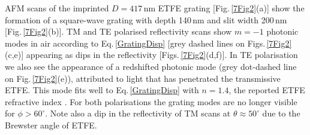 AFM scans of the imprinted $D=417$\,nm ETFE grating [Fig.\,\ref{7Fig2}(a)] show the formation of a square-wave grating with depth 140\,nm and slit width 200\,nm [Fig.\,\ref{7Fig2}(b)]. TM and TE polarised reflectivity scans show $m=-1$ photonic modes in air according to Eq.\,\ref{GratingDisp} [grey dashed lines on Figs.\,\ref{7Fig2}(c,e)] appearing as dips in the reflectivity [Figs.\,\ref{7Fig2}(d,f)]. In TE polarisation we also see the appearance of a redshifted photonic mode (grey dot-dashed line on Fig.\,\ref{7Fig2}(e)), attributed to light that has penetrated the transmissive ETFE. This mode fits well to Eq.\,\ref{GratingDisp} with $n=1.4$, the reported ETFE refractive index \cite{French2011}. For both polarisations the grating modes are no longer visible for $\phi>60^{\circ}$. Note also a dip in the reflectivity of TM scans at $\theta\approx50^{\circ}$ due to the Brewster angle of ETFE.

